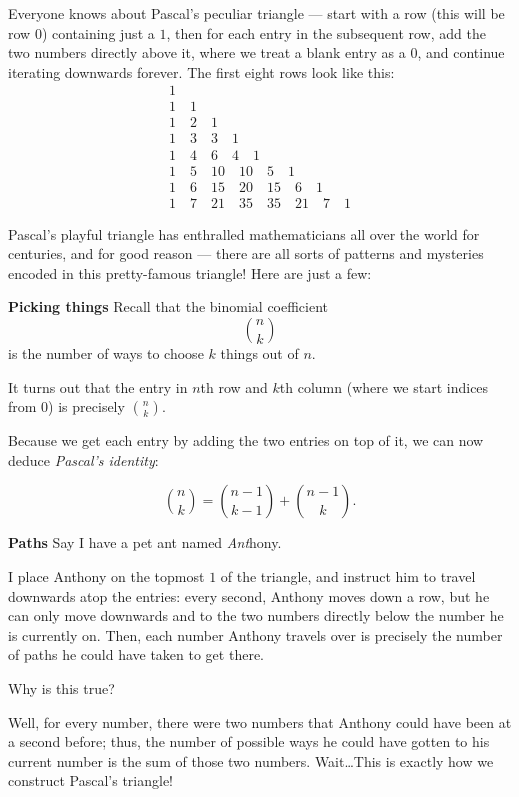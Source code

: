 \documentclass{article}
\begin{document}
\begin{multicols}{3}
Everyone knows about Pascal’s peculiar triangle --- start with a row (this will be row $0$) containing just a $1$, then for each entry in the subsequent row, add the two numbers directly above it, where we treat a blank entry as a $0$, and continue iterating downwards forever. The first eight rows look like this:
\[\begin{array}{c}1\\1\quad 1\\1\quad 2\quad 1\\1\quad 3\quad 3\quad 1\\1\quad 4\quad 6\quad 4\quad 1\\1\quad 5\quad 10\quad 10\quad 5\quad 1\\1\quad 6\quad 15\quad 20\quad 15\quad 6\quad 1\\1\quad 7\quad 21\quad 35\quad 35\quad 21\quad 7\quad 1\end{array}\] %

Pascal’s playful triangle has enthralled mathematicians all over the world for centuries, and for good reason --- there are all sorts of patterns and mysteries encoded in this pretty-famous triangle! Here are just a few:

\textbf{Picking things}
Recall that the binomial coefficient 
\[
	\binom nk
\]
is the number of ways to choose $k$ things out of $n$. 

It turns out that the entry in $n$th row and $k$th column (where we start indices from $0$) is precisely $\binom nk$.

Because we get each entry by adding the two entries on top of it, we can now deduce \textit{Pascal's identity}:

\[\binom nk=\binom{n-1}{k-1}+\binom{n-1}k.\]

\textbf{Paths}
Say I have a pet ant named \textit{Ant}hony. 

I place Anthony on the topmost $1$ of the triangle, and instruct him to travel downwards atop the entries: every second, Anthony moves down a row, but he can only move downwards and to the two numbers directly below the number he is currently on.
Then, each number Anthony travels over is precisely the number of paths he could have taken to get there. 

Why is this true? 

Well, for every number, there were two numbers that Anthony could have been at a second before; thus, the number of possible ways he could have gotten to his current number is the sum of those two numbers. Wait\dots This is exactly how we construct Pascal's triangle!


\end{multicols}
\end{document}
